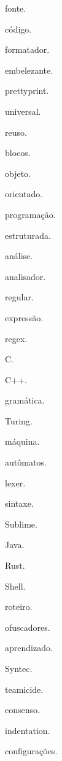 {
    \item fonte. \item código. \item formatador. \item embelezante. \item prettyprint. \item
    universal. \item reuso. \item blocos. \item objeto. \item orientado. \item programação. \item
    estruturada. \item análise. \item analisador. \item regular. \item expressão. \item regex. \item
    C. \item C++. \item gramática. \item Turing. \item máquina. \item autômatos. \item lexer. \item
    sintaxe. \item Sublime. \item Java. \item Rust. \item Shell. \item roteiro. \item ofuscadores.
    \item aprendizado. \item Syntec. \item teamicide. \item consenso. \item indentation. \item
    configurações.
}

\addto\captionsbrazil
{
    \renewcommand{\orientadorname}{Orientador}
    \renewcommand{\coorientadorname}{Coorientador}
}

